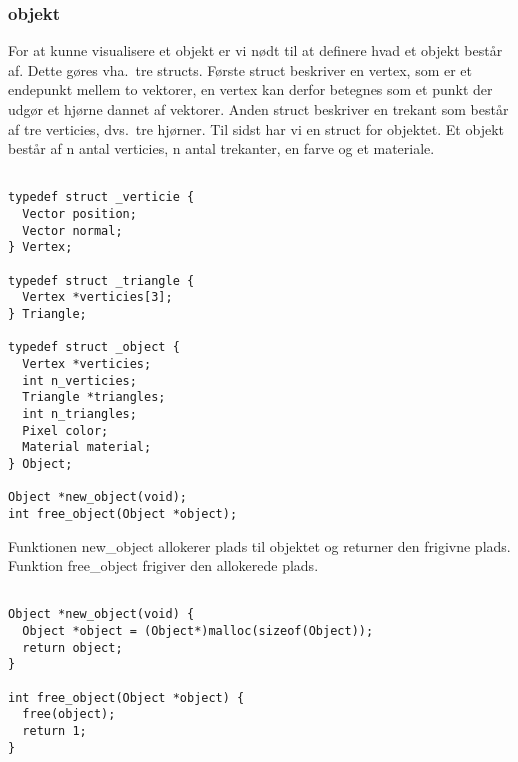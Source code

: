 \subsubsection{objekt}
For at kunne visualisere et objekt er vi nødt til at definere hvad et objekt består af. Dette gøres vha.\ tre structs. Første struct beskriver en vertex, som er et endepunkt mellem to vektorer, en vertex kan derfor betegnes som et punkt der udgør et hjørne dannet af vektorer. Anden struct beskriver en trekant som består af tre verticies, dvs.\ tre hjørner. Til sidst har vi en struct for objektet. Et objekt består af n antal verticies, n antal trekanter, en farve og et materiale. 

\begin{lstlisting}[style=Cstyle, caption=Objekter]

typedef struct _verticie {
  Vector position;
  Vector normal;
} Vertex;

typedef struct _triangle {
  Vertex *verticies[3];
} Triangle;

typedef struct _object {
  Vertex *verticies;
  int n_verticies;
  Triangle *triangles;
  int n_triangles;
  Pixel color;
  Material material;
} Object;

Object *new_object(void);
int free_object(Object *object);

\end{lstlisting}

Funktionen new\_object allokerer plads til objektet og returner den frigivne plads. Funktion free\_object frigiver den allokerede plads. 
\begin{lstlisting}[style=Cstyle, caption=Funktionerne]

Object *new_object(void) {
  Object *object = (Object*)malloc(sizeof(Object));
  return object;
}

int free_object(Object *object) {
  free(object);
  return 1;
}

\end{lstlisting}



